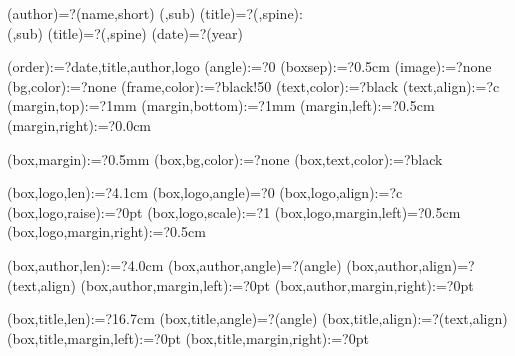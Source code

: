 
%


\makeatletter




\spine(author)=?{\thedocauthor(name,short)}
(\@LANG@COVER,sub){%
  \spine(title)=?{\thedoctitle(\@LANG@COVER,spine):\\\thedoctitle(\@LANG@COVER,sub)}
}{%
  \spine(title)=?{\thedoctitle(\@LANG@COVER,spine)}
}
\spine(date)=?{\thentdocdate(year)}


\spine(order):=?{date,title,author,logo}
\spine(angle):=?{0}
\spine(boxsep):=?{0.5cm}
\spine(image):=?{none}
\spine(bg,color):=?{none}
\spine(frame,color):=?{black!50}
\spine(text,color):=?{black}
\spine(text,align):=?{c}
\spine(margin,top):=?{1mm}
\spine(margin,bottom):=?{1mm}
\spine(margin,left):=?{0.5cm}
\spine(margin,right):=?{0.0cm}

\spine(box,margin):=?{0.5mm}
\spine(box,bg,color):=?{none}
\spine(box,text,color):=?{black}

\spine(box,logo,len):=?{4.1cm}
\spine(box,logo,angle)=?{0}
\spine(box,logo,align):=?{c}
\spine(box,logo,raise):=?{0pt}
\spine(box,logo,scale):=?{1}
\spine(box,logo,margin,left)=?{0.5cm}
\spine(box,logo,margin,right):=?{0.5cm}

\spine(box,author,len):=?{4.0cm}
\spine(box,author,angle)=?{\thespine(angle)}
\spine(box,author,align)=?{\thespine(text,align)}
\spine(box,author,margin,left):=?{0pt}
\spine(box,author,margin,right):=?{0pt}

\spine(box,title,len):=?{16.7cm}
\spine(box,title,angle)=?{\thespine(angle)}
\spine(box,title,align):=?{\thespine(text,align)}
\spine(box,title,margin,left):=?{0pt}
\spine(box,title,margin,right):=?{0pt}

